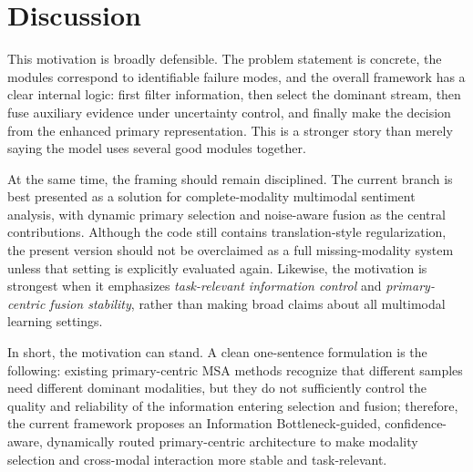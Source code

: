 \documentclass[11pt]{article}
\begin{document}
\section{Discussion}

This motivation is broadly defensible. The problem statement is concrete, the
modules correspond to identifiable failure modes, and the overall framework has
a clear internal logic: first filter information, then select the dominant
stream, then fuse auxiliary evidence under uncertainty control, and finally make
the decision from the enhanced primary representation. This is a stronger story
than merely saying the model uses several good modules together.

At the same time, the framing should remain disciplined. The current branch is
best presented as a solution for complete-modality multimodal sentiment
analysis, with dynamic primary selection and noise-aware fusion as the central
contributions. Although the code still contains translation-style regularization,
the present version should not be overclaimed as a full missing-modality system
unless that setting is explicitly evaluated again. Likewise, the motivation is
strongest when it emphasizes \emph{task-relevant information control} and
\emph{primary-centric fusion stability}, rather than making broad claims about
all multimodal learning settings.

In short, the motivation can stand. A clean one-sentence formulation is the
following: existing primary-centric MSA methods recognize that different samples
need different dominant modalities, but they do not sufficiently control the
quality and reliability of the information entering selection and fusion;
therefore, the current framework proposes an Information Bottleneck-guided,
confidence-aware, dynamically routed primary-centric architecture to make
modality selection and cross-modal interaction more stable and task-relevant.
\end{document}
